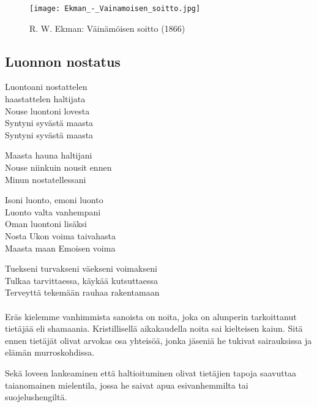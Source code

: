 
\begin{figure}[!ht]
  \caption{R. W. Ekman: Väinämöisen soitto (1866)}
  \centering
  \texttt{[image: Ekman\_-\_Vainamoisen\_soitto.jpg]}
\end{figure}  

\clearpage
\subsection{Luonnon nostatus}

  \begin{center}
    Luontoani nostattelen \\
    haastattelen haltijata \\
    Nouse luontoni lovesta \\
    Syntyni syvästä maasta \\
    Syntyni syvästä maasta \\
  \end{center}
  \begin{center}
    Maasta hauna haltijani \\
    Nouse niinkuin nousit ennen \\
    Minun nostatellessani \\
  \end{center}
  \begin{center}
    Isoni luonto, emoni luonto \\
    Luonto valta vanhempani \\
    Oman luontoni lisäksi \\
    Nosta Ukon voima taivahasta \\
    Maasta maan Emoisen voima \\
  \end{center}
  \begin{center}
    Tuekseni turvakseni väekseni voimakseni \\
    Tulkaa tarvittaessa, käykää kutsuttaessa \\
    Terveyttä tekemään rauhaa rakentamaan \\  
  \end{center}

  \paragraph{}
  \begin{em}    
    Eräs kielemme vanhimmista sanoista on noita, joka on alunperin tarkoittanut tietäjää eli 
    shamaania. Kristillisellä aikakaudella noita sai kielteisen kaiun. Sitä ennen tietäjät 
    olivat arvokas osa yhteisöä, jonka jäseniä he tukivat sairauksissa ja elämän murroskohdissa.       
      
    Sekä loveen lankeaminen että haltioituminen olivat tietäjien tapoja saavuttaa taianomainen 
    mielentila, jossa he saivat apua esivanhemmilta tai suojelushengiltä.    
  \end{em}
 
